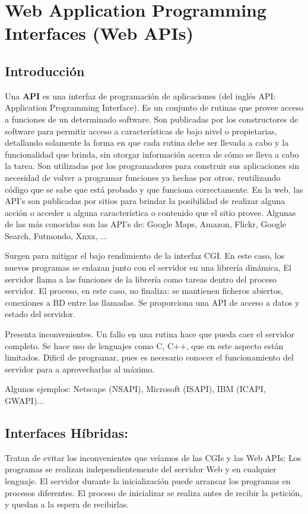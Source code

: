 \documentclass{apuntes}
\begin{document}
\section{Web Application Programming Interfaces (Web APIs)}
\subsection{Introducción}
Una \textbf{API} es una interfaz de programación de aplicaciones (del inglés API: Application Programming Interface). Es un conjunto de rutinas que provee acceso a funciones de un determinado software.
Son publicadas por los constructores de software para permitir acceso a características de bajo nivel o propietarias, detallando solamente la forma en que cada rutina debe ser llevada a cabo y la funcionalidad que brinda, sin otorgar información acerca de cómo se lleva a cabo la tarea. Son utilizadas por los programadores para construir sus aplicaciones sin necesidad de volver a programar funciones ya hechas por otros, reutilizando código que se sabe que está probado y que funciona correctamente.
En la web, las API's son publicadas por sitios para brindar la posibilidad de realizar alguna acción o acceder a alguna característica o contenido que el sitio provee. Algunas de las más conocidas son las API's de: Google Maps, Amazon, Flickr, Google Search, Futmondo, Xnxx, ...

Surgen para mitigar el bajo rendimiento de la interfaz CGI. En este caso, los nuevos programas se enlazan junto con el servidor en una librería dinámica, El servidor llama a las funciones de la librería como tareas dentro del proceso servidor. El proceso, en este caso, no finaliza: se mantienen ficheros abiertos, conexiones a BD entre las llamadas. Se proporciona una API de acceso a datos y estado del servidor.

Presenta inconvenientes. Un fallo en una rutina hace que pueda caer el servidor completo. Se hace uso de lenguajes como C, C++, que en este aspecto están limitados. Dificil de programar, pues es necesario conocer el funcionamiento del servidor para a aprovecharlas al máximo.

Algunos ejemplos: Netscape (NSAPI), Microsoft (ISAPI), IBM (ICAPI, GWAPI)...

\subsection{Interfaces Híbridas:}
Tratan de evitar los inconvenientes que veíamos de las CGIs y las Web APIs:
Los programas se realizan independientemente del servidor Web y en cualquier lenguaje.
El servidor durante la inicialización puede arrancar los programas en procesos diferentes.
El proceso de inicializar se realiza antes de recibir la petición, y quedan a la espera de recibirlas.
\end{document}
